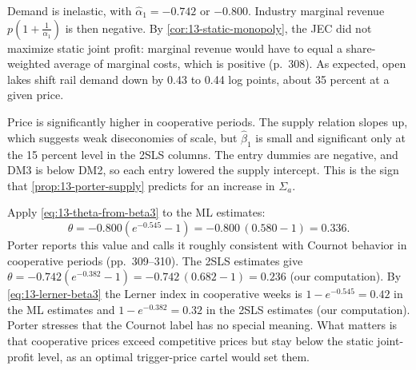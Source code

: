 Demand is inelastic, with $\hat\alpha_1 = -0.742$ or $-0.800$. Industry marginal revenue
$p(1 + \frac{1}{\alpha_1})$ is then negative. By \cref{cor:13-static-monopoly}, the JEC did not maximize static joint
profit: marginal revenue would have to equal a share-weighted average of marginal costs, which is positive
(p.~308). As expected, open lakes shift rail demand down by 0.43 to 0.44 log points, about 35 percent at a
given price.

Price is significantly higher in cooperative periods. The supply relation slopes up, which suggests weak
diseconomies of scale, but $\hat\beta_1$ is small and significant only at the 15 percent level in the 2SLS columns.
The entry dummies are negative, and DM3 is below DM2, so each entry lowered the supply intercept. This is the sign
that \cref{prop:13-porter-supply} predicts for an increase in $\Sigma_a$.

\begin{example}\label{ex:13-porter-theta}
Apply \eqref{eq:13-theta-from-beta3} to the ML estimates:
\begin{equation*}
  \theta = -0.800\left(e^{-0.545} - 1\right) = -0.800\,(0.580 - 1) = 0.336 .
\end{equation*}
Porter reports this value and calls it roughly consistent with Cournot behavior in cooperative periods (pp.~309--310).
The 2SLS estimates give $\theta = -0.742(e^{-0.382} - 1) = -0.742\,(0.682 - 1) = 0.236$ (our computation). By
\eqref{eq:13-lerner-beta3} the Lerner index in cooperative weeks is $1 - e^{-0.545} = 0.42$ in the ML estimates and
$1 - e^{-0.382} = 0.32$ in the 2SLS estimates (our computation). Porter stresses that the Cournot label has no special
meaning. What matters is that cooperative prices exceed competitive prices but stay below the static joint-profit
level, as an optimal trigger-price cartel would set them.
\end{example}

